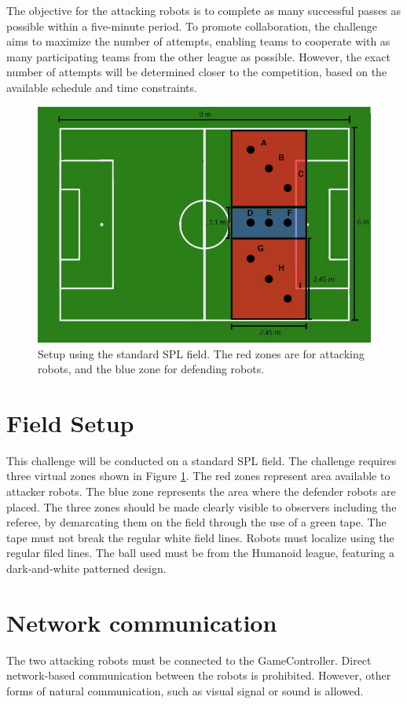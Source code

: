 \documentclass[12pt]{article}
\begin{document}
The objective for the attacking robots is to complete as many successful passes as possible within a five-minute period.
To promote collaboration, the challenge aims to maximize the number of attempts, enabling teams to cooperate with as many participating teams from the other league as possible.
However, the exact number of attempts will be determined closer to the competition, based on the available schedule and time constraints.
\begin{figure}[ht]
\includegraphics[width=0.95\linewidth]{figs/ch_2_full.jpg}
\caption{Setup using the standard SPL field. The red zones are for attacking robots, and the blue zone for defending robots. }
\label{ch2:zone96}
\centering
\end{figure}

\section{Field Setup}
This challenge will be conducted on a standard SPL field.
The challenge requires three virtual zones shown in Figure \ref{ch2:zone96}.
The red zones represent area available to attacker robots. The blue zone represents the area where the defender robots are placed.
The three zones should be made clearly visible to observers including the referee, by demarcating them on the field through the use of a green tape. The tape must not break the regular white field lines.
Robots must localize using the regular filed lines.
The ball used must be from the Humanoid league, featuring a dark-and-white patterned design.

\section{Network communication}
The two attacking robots must be connected to the GameController.
Direct network-based communication between the robots is prohibited.
However, other forms of natural communication, such as visual signal or sound is allowed.
\end{document}
